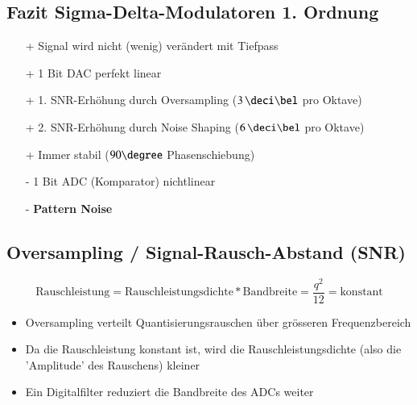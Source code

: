 
\subsection{Fazit Sigma-Delta-Modulatoren 1. Ordnung}

\begin{minipage}[t]{0.48\columnwidth}
    \begin{itemize}
        \item[+] Signal wird nicht (wenig) verändert mit Tiefpass
        \item[+] 1 Bit DAC perfekt linear 
        \item[+] 1. SNR-Erhöhung durch Oversampling ($3 \, \deci \bel$ pro Oktave)
    \end{itemize}
\end{minipage}
\hfill
\begin{minipage}[t]{0.48\columnwidth}
    \begin{itemize}
        \item[+] 2. SNR-Erhöhung durch Noise Shaping ($6 \, \deci \bel$ pro Oktave)
        \item[+] Immer stabil ($90 \degree$ Phasenschiebung)
        \item[-] 1 Bit ADC (Komparator) nichtlinear
        \item[-] \textbf{Pattern Noise} 
    \end{itemize}
\end{minipage}


\subsection{Oversampling / Signal-Rausch-Abstand (SNR)}

$$ \boxed{ \text{Rauschleistung} = \text{Rauschleistungsdichte} * \text{Bandbreite} = \frac{q^2}{12} = \text{konstant}} $$

\begin{itemize}
    \item Oversampling verteilt Quantisierungsrauschen über grösseren Frequenzbereich
    \item Da die Rauschleistung konstant ist, wird die Rauschleistungsdichte (also die 'Amplitude' des Rauschens) kleiner
    \item Ein Digitalfilter reduziert die Bandbreite des ADCs weiter
\end{itemize}

